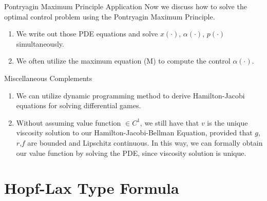 \documentclass[english]{pkuslide}
\begin{document}
\begin{frame}{Pontryagin Maximum Principle} {Application}
Now we discuss how to solve the optimal control problem using the Pontryagin Maximum Principle.
\begin{enumerate}
\item We write out those PDE equations and solve $x(\cdot)$, $\alpha(\cdot)$, $p(\cdot)$ simultaneously.
\item We often utilize the maximum equation (M) to compute the control $\alpha(\cdot)$.
\end{enumerate}
\end{frame}
\begin{frame}{Miscellaneous Complements} 
\begin{enumerate}[<+->]
\item We can utilize dynamic programming method to derive Hamilton-Jacobi equations for solving differential games.
\item Without assuming value function $\in C^1$, we still have that $v$ is the unique viscosity solution to our Hamilton-Jacobi-Bellman Equation, provided that $g$,$r$,$f$ are bounded and Lipschitz continuous. In this way, we can formally obtain our value function by solving the PDE, since viscosity solution is unique.
\end{enumerate}
\end{frame}
\section{Hopf-Lax Type Formula}
	\frame{\sectionpage}
\end{document}
